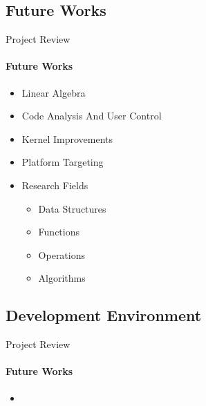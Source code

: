 	\subsection{Future Works}
	\begin{frame}[t]{Project Review}\framesubtitle{Future Works}
		\begin{itemize}
			\item Linear Algebra
			\item Code Analysis And User Control
			\item Kernel Improvements
			\item Platform Targeting
			\item Research Fields
			\begin{itemize}
				\item Data Structures
				\item Functions
				\item Operations
				\item Algorithms
			\end{itemize}
		\end{itemize}
	\end{frame}

	\subsection{Development Environment}%
	\begin{frame}[t]{Project Review}\framesubtitle{Future Works}
		\begin{itemize}
			\item
		\end{itemize}
	\end{frame}